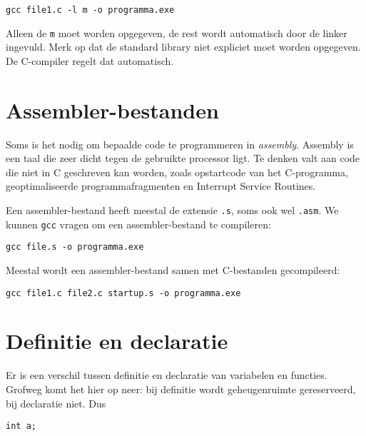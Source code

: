 \begin{lstlisting}[style=lstoneline]
gcc file1.c -l m -o programma.exe
\end{lstlisting}

Alleen de \texttt{m} moet worden opgegeven, de rest wordt automatisch door de linker ingevuld. Merk op dat de standard library niet expliciet moet worden opgegeven. De C-compiler regelt dat automatisch.


\section{Assembler-bestanden}
Soms is het nodig om bepaalde code te programmeren in \textit{assembly}. Assembly is een taal die zeer dicht tegen de gebruikte processor ligt. Te denken valt aan code die niet in C geschreven kan worden, zoals opstartcode van het C-programma, geoptimaliseerde programmafragmenten en Interrupt Service Routines.

Een assembler-bestand heeft meestal de extensie \texttt{.s}, soms ook wel \texttt{.asm}. We kunnen \texttt{gcc} vragen om een assembler-bestand te compileren:

\begin{lstlisting}[style=lstoneline]
gcc file.s -o programma.exe
\end{lstlisting}

Meestal wordt een assembler-bestand samen met C-bestanden gecompileerd:

\begin{lstlisting}[style=lstoneline]
gcc file1.c file2.c startup.s -o programma.exe
\end{lstlisting}


\section{Definitie en declaratie}
Er is een verschil tussen definitie en declaratie van variabelen en functies. Grofweg komt het hier op neer: bij definitie wordt geheugenruimte gereserveerd, bij declaratie niet. Dus

\begin{lstlisting}[style=lstoneline]
int a;
\end{lstlisting}

